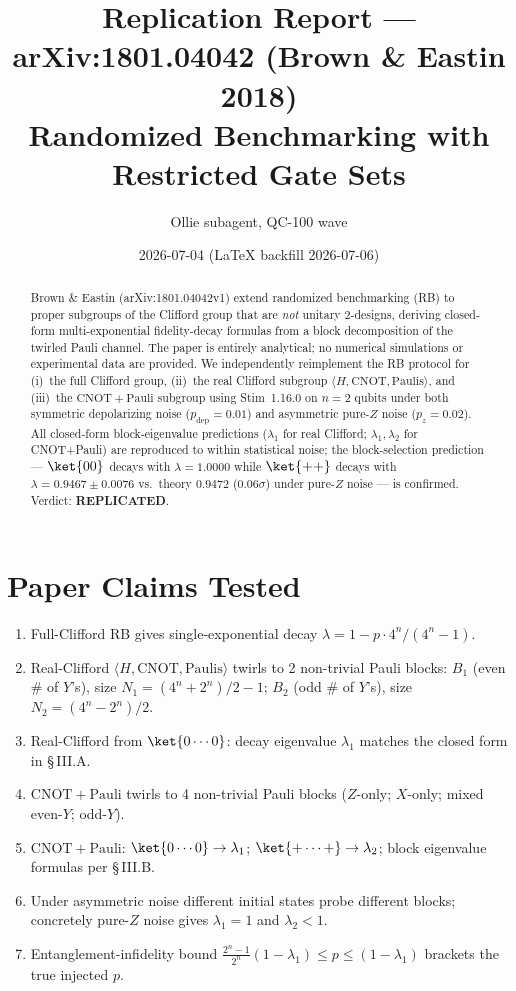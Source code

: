 \documentclass[11pt]{article}
\title{Replication Report --- arXiv:1801.04042 (Brown \& Eastin 2018)\\
\large Randomized Benchmarking with Restricted Gate Sets}
\author{Ollie subagent, QC-100 wave}
\date{2026-07-04 (LaTeX backfill 2026-07-06)}
\begin{document}
\maketitle

\begin{abstract}
Brown \& Eastin (arXiv:1801.04042v1) extend randomized benchmarking (RB) to proper
subgroups of the Clifford group that are \emph{not} unitary 2-designs, deriving
closed-form multi-exponential fidelity-decay formulas from a block decomposition
of the twirled Pauli channel. The paper is entirely analytical; no numerical
simulations or experimental data are provided. We independently reimplement the
RB protocol for (i)~the full Clifford group, (ii)~the real Clifford subgroup
$\langle H, \mathrm{CNOT}, \mathrm{Paulis}\rangle$, and (iii)~the
$\mathrm{CNOT}+\mathrm{Pauli}$ subgroup using Stim~1.16.0 on $n=2$ qubits under
both symmetric depolarizing noise ($p_{\mathrm{dep}}=0.01$) and asymmetric
pure-$Z$ noise ($p_z=0.02$). All closed-form block-eigenvalue predictions
($\lambda_1$ for real Clifford; $\lambda_1,\lambda_2$ for CNOT+Pauli) are
reproduced to within statistical noise; the block-selection prediction ---
$\ket{00}$ decays with $\lambda=1.0000$ while $\ket{++}$ decays with
$\lambda=0.9467 \pm 0.0076$ vs.\ theory $0.9472$ ($0.06\sigma$) under pure-$Z$
noise --- is confirmed. Verdict: \textbf{REPLICATED}.
\end{abstract}

\section{Paper Claims Tested}
\begin{enumerate}
  \item[C1] Full-Clifford RB gives single-exponential decay
    $\lambda = 1 - p \cdot 4^n/(4^n-1)$.
  \item[C2] Real-Clifford $\langle H, \mathrm{CNOT}, \mathrm{Paulis}\rangle$
    twirls to 2 non-trivial Pauli blocks: $B_1$ (even \# of $Y$'s), size
    $N_1 = (4^n+2^n)/2 - 1$; $B_2$ (odd \# of $Y$'s), size $N_2 = (4^n-2^n)/2$.
  \item[C3] Real-Clifford from $\ket{0\cdots 0}$: decay eigenvalue $\lambda_1$
    matches the closed form in \S\,III.A.
  \item[C4] $\mathrm{CNOT}+\mathrm{Pauli}$ twirls to 4 non-trivial Pauli blocks
    ($Z$-only; $X$-only; mixed even-$Y$; odd-$Y$).
  \item[C5] $\mathrm{CNOT}+\mathrm{Pauli}$: $\ket{0\cdots 0} \to \lambda_1$;
    $\ket{+\cdots +} \to \lambda_2$; block eigenvalue formulas per \S\,III.B.
  \item[C6] Under asymmetric noise different initial states probe different
    blocks; concretely pure-$Z$ noise gives $\lambda_1 = 1$ and $\lambda_2 < 1$.
  \item[C7] Entanglement-infidelity bound
    $\tfrac{2^n-1}{2^n}(1-\lambda_1) \le p \le (1-\lambda_1)$ brackets the true
    injected $p$.
\end{enumerate}
\end{document}
